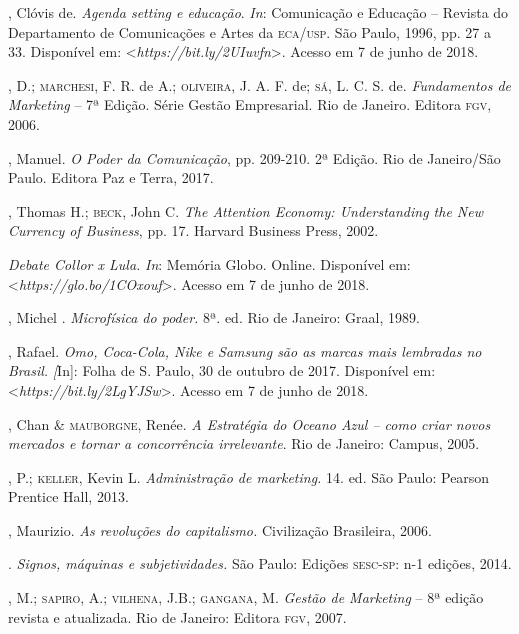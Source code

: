 \begin{bibliohedra}

, Clóvis de. \emph{Agenda setting e educação}. \emph{In}:
Comunicação e Educação -- Revista do Departamento de Comunicações e
Artes da \textsc{eca}/\textsc{usp}. São Paulo, 1996, pp. 27 a 33. Disponível em:
\textless{}\emph{https://bit.ly/2UIuvfn}\textgreater{}. Acesso em 7 de junho de 2018.

, D.; \textsc{marchesi}, F. R. de A.; \textsc{oliveira}, J. A. F. de; \textsc{sá}, L. C. S. de. \emph{Fundamentos de Marketing} -- 7ª Edição. Série Gestão
Empresarial. Rio de Janeiro. Editora \textsc{fgv}, 2006.

, Manuel. \emph{O Poder da Comunicação}, pp. 209-210. 2ª
Edição. Rio de Janeiro/São Paulo. Editora Paz e Terra, 2017.

, Thomas H.; \textsc{beck}, John C. \emph{The Attention Economy:
Understanding the New Currency of Business}, pp. 17. Harvard Business
Press, 2002.

\emph{Debate Collor x Lula.} \emph{In}: Memória Globo. Online. Disponível em:
\textless{}\emph{https://glo.bo/1COxouf}\textgreater{}. Acesso em 7 de junho de 2018.

, Michel . \emph{Microfísica do poder.} 8ª. ed. Rio de
Janeiro: Graal, 1989.

, Rafael. \emph{Omo, Coca-Cola, Nike e Samsung são as marcas
mais lembradas no Brasil.} \emph[In]: Folha de S. Paulo, 30 de outubro de 2017.
Disponível em: \textless{}\emph{https://bit.ly/2LgYJSw}\textgreater{}. Acesso em 7 de junho de 2018.

, Chan \& \textsc{mauborgne}, Renée. \emph{A Estratégia do Oceano Azul --
como criar novos mercados e tornar a concorrência irrelevante}. Rio de
Janeiro: Campus, 2005.

, P.; \textsc{keller}, Kevin L. \emph{Administração de marketing.} 14.
ed. São Paulo: Pearson Prentice Hall, 2013.

, Maurizio. \emph{As revoluções do capitalismo.} Civilização
Brasileira, 2006.

\titidem. \emph{Signos, máquinas e subjetividades.} São
Paulo: Edições \textsc{sesc-sp}: n-1 edições, 2014.

, M.; \textsc{sapiro}, A.; \textsc{vilhena}, J.B.; \textsc{gangana}, M. \emph{Gestão de Marketing} -- 8ª edição revista e atualizada. Rio de Janeiro: Editora
\textsc{fgv}, 2007.


\end{bibliohedra}
